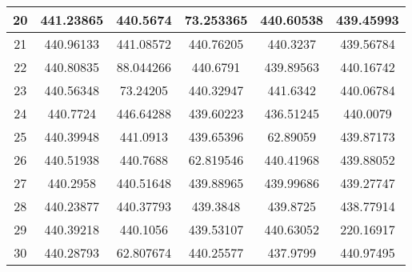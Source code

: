 \begin{table}
\begin{center}
\begin{tabular}{|c|c|c|c|c|c|}
20 & 441.23865 & 440.5674  & 73.253365  & 440.60538 & 439.45993 \\ \hline
21 & 440.96133 & 441.08572 & 440.76205  & 440.3237  & 439.56784 \\ \hline
22 & 440.80835 & 88.044266 & 440.6791   & 439.89563 & 440.16742 \\ \hline
23 & 440.56348 & 73.24205  & 440.32947  & 441.6342  & 440.06784 \\ \hline
24 & 440.7724  & 446.64288 & 439.60223  & 436.51245 & 440.0079  \\ \hline
25 & 440.39948 & 441.0913  & 439.65396  & 62.89059  & 439.87173 \\ \hline
26 & 440.51938 & 440.7688  & 62.819546  & 440.41968 & 439.88052 \\ \hline
27 & 440.2958  & 440.51648 & 439.88965  & 439.99686 & 439.27747 \\ \hline
28 & 440.23877 & 440.37793 & 439.3848   & 439.8725  & 438.77914 \\ \hline
29 & 440.39218 & 440.1056  & 439.53107  & 440.63052 & 220.16917 \\ \hline
30 & 440.28793 & 62.807674 & 440.25577  & 437.9799  & 440.97495 \\ \hline
\end{tabular}
\label{table:przyklad}
\end{center}
\end{table}


